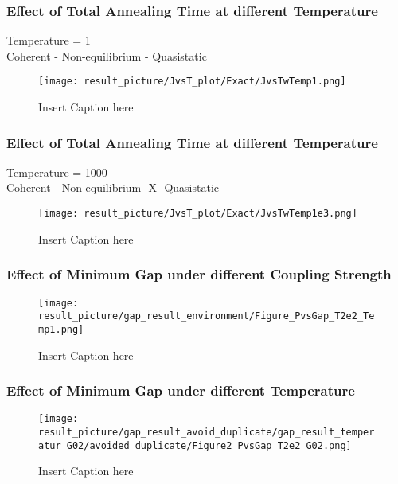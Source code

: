 \documentclass{beamer}
\begin{document}
\begin{frame}
	\frametitle{Effect of Total Annealing Time at different Temperature}
	Temperature = 1\\
	Coherent - Non-equilibrium - Quasistatic
	\begin{figure}
		\centering
		\texttt{[image: result\_picture/JvsT\_plot/Exact/JvsTwTemp1.png]}
		\caption{Insert Caption here}
	\end{figure}
\end{frame}

\begin{frame}
	\frametitle{Effect of Total Annealing Time at different Temperature}
	Temperature = 1000\\
	Coherent - Non-equilibrium -X- Quasistatic
	\begin{figure}
		\centering
		\texttt{[image: result\_picture/JvsT\_plot/Exact/JvsTwTemp1e3.png]}
		\caption{Insert Caption here}
	\end{figure}
\end{frame}

\begin{frame}
	\frametitle{Effect of Minimum Gap under different Coupling Strength }

	\begin{figure}
		\centering
		\texttt{[image: result\_picture/gap\_result\_environment/Figure\_PvsGap\_T2e2\_Temp1.png]}
		
		\caption{Insert Caption here}
	\end{figure}
\end{frame}

\begin{frame}
	\frametitle{Effect of Minimum Gap under different Temperature }
	
	\begin{figure}
		\centering
		\texttt{[image: result\_picture/gap\_result\_avoid\_duplicate/gap\_result\_temperatur\_G02/avoided\_duplicate/Figure2\_PvsGap\_T2e2\_G02.png]}	
		\caption{Insert Caption here}
	\end{figure}
\end{frame}





\end{document}
